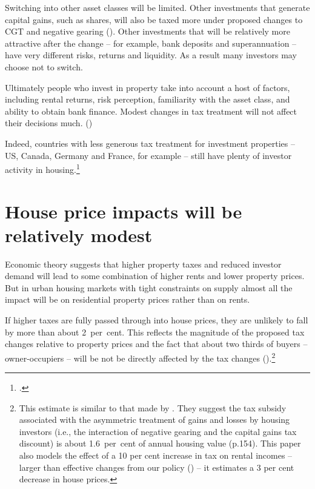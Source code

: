 \documentclass{grattanAlpha}\usepackage[]{graphicx}\usepackage[]{color}
\begin{document}
Switching into other asset classes will be limited. Other investments that generate capital gains, such as shares, will also be taxed more under proposed changes to CGT and negative gearing (). Other investments that will be relatively more attractive after the change – for example, bank deposits and superannuation – have very different risks, returns and liquidity. As a result many investors may choose not to switch. 

Ultimately people who invest in property take into account a host of factors, including rental returns, risk perception, familiarity with the asset class, and ability to obtain bank finance. Modest changes in tax treatment will not affect their decisions much. ()

Indeed, countries with less generous tax treatment for investment properties – US, Canada, Germany and France, for example – still have plenty of investor activity in housing.\footcite{ABS2010MeasuresOfAustraliasProgress}



\section{House price impacts will be relatively modest}
Economic theory suggests that higher property taxes and reduced investor demand will lead to some combination of higher rents and lower property prices. But in urban housing markets with tight constraints on supply almost all the impact will be on residential property prices rather than on rents.

If higher taxes are fully passed through into house prices, they are unlikely to fall by more than about 2~per~cent. This reflects the magnitude of the proposed tax changes relative to property prices and the fact that about two thirds of buyers – owner-occupiers – will be not be directly affected by the tax changes ().\footnote{This estimate is similar to that made by \textcite[][154]{AbelsonJoyeux2007}. They suggest the tax subsidy associated with the asymmetric treatment of gains and losses by housing investors (i.e., the interaction of negative gearing and the capital gains tax discount) is about 1.6~per~cent of annual housing value (p.154). This paper also models the effect of a 10 per cent increase in tax on rental incomes – larger than effective changes from our policy () – it estimates a 3 per cent decrease in house prices.}
\end{document}
